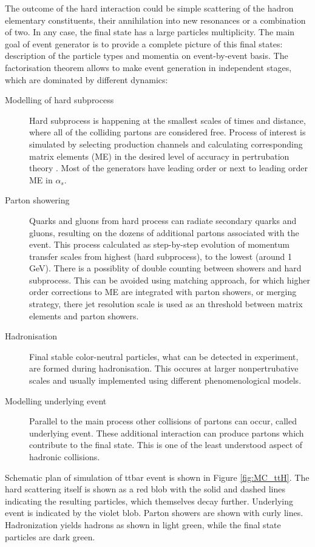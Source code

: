 The outcome of the hard interaction could be simple scattering of the hadron elementary constituents, their annihilation into new resonances or a combination of two. In any case, the final state has a large particles multiplicity. The main goal of event generator is to provide a complete picture of this final states: description of the particle types and momentia on event-by-event basis. The factorisation theorem \cite{Factorisation} allows to make event generation in independent stages, which are dominated by different dynamics:
\begin{description}

\item[Modelling of hard subprocess] Hard subprocess is happening at the smallest scales of times and distance, where all of the colliding partons are considered free. Process of interest is simulated by selecting production channels and calculating corresponding matrix elements (ME) in the desired level of accuracy in pertrubation theory . Most of the generators have leading order or next to leading order ME in $\alpha_s$. 
\item[Parton showering] Quarks and gluons from hard process can radiate secondary quarks and gluons, resulting on the dozens of additional partons associated with the event. This process calculated as step-by-step evolution of momentum transfer scales from highest (hard subprocess), to the lowest (around 1 GeV). 
There is a possiblity of double counting between showers and hard subprocess. This can be avoided using matching approach, for which higher order corrections to ME are integrated with parton showers, or merging strategy, there jet resolution scale is used as an threshold between matrix elements and parton showers. 
\item[Hadronisation] Final stable color-neutral particles, what can be detected in experiment, are formed during hadronisation. This occures at larger nonpertrubative scales and  usually implemented using different phenomenological models.
\item[Modelling underlying event] Parallel to the main process other collisions of partons can occur, called underlying event. These additional interaction can produce partons which contribute to the final state. This is one of the least understood aspect of hadronic collisions. 

\end{description}

Schematic plan of simulation of ttbar event is shown in Figure \ref{fig:MC_ttH}. The hard scattering itself is shown as a red blob with the solid and dashed lines indicating the resulting particles, which themselves decay further. 
Underlying event is indicated by the violet blob. 
Parton showers are shown with curly lines.
Hadronization yields hadrons as shown in light green, while the final state particles are dark green.

